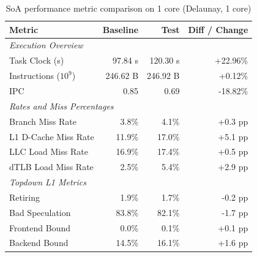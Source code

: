 \begin{table}[htbp]
  \centering
  \caption{SoA performance metric comparison on 1 core (Delaunay, 1 core)}
  \label{tab:perf_comparison_soa_delaunay_1core}
  \begin{tabular}{lrrr}
    \toprule
    \textbf{Metric} & \textbf{Baseline} & \textbf{Test} & \textbf{Diff / Change} \\
    \midrule
    \multicolumn{4}{l}{\textit{Execution Overview}} \\
    \quad Task Clock (s)           & 97.84 s   & 120.30 s   & +22.96\%   \\
    \quad Instructions ($10^9$)    & 246.62 B  & 246.92 B  & +0.12\%   \\
    \quad IPC                      & 0.85       & 0.69       & -18.82\%    \\
    \midrule
    \multicolumn{4}{l}{\textit{Rates and Miss Percentages}} \\
    \quad Branch Miss Rate         & 3.8\%      & 4.1\%      & +0.3 pp     \\
    \quad L1 D-Cache Miss Rate     & 11.9\%      & 17.0\%      & +5.1 pp    \\
    \quad LLC Load Miss Rate       & 16.9\%     & 17.4\%     & +0.5 pp    \\
    \quad dTLB Load Miss Rate      & 2.5\%      & 5.4\%      & +2.9 pp     \\
    \midrule
    \multicolumn{4}{l}{\textit{Topdown L1 Metrics}} \\
    \quad Retiring                 & 1.9\%      & 1.7\%      & -0.2 pp    \\
    \quad Bad Speculation          & 83.8\%     & 82.1\%     & -1.7 pp   \\
    \quad Frontend Bound           & 0.0\%      & 0.1\%      & +0.1 pp    \\
    \quad Backend Bound            & 14.5\%      & 16.1\%      & +1.6 pp    \\
    \bottomrule
  \end{tabular}
\end{table}

